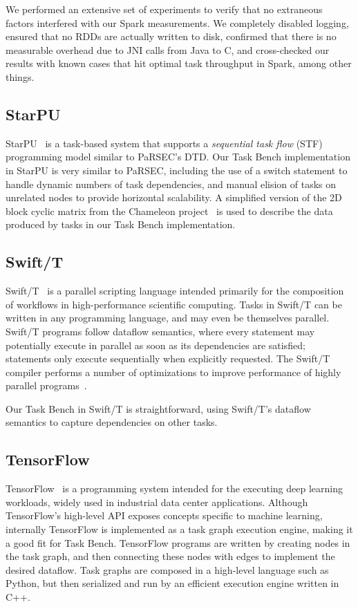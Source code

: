 We performed an extensive set of experiments to verify that no
extraneous factors interfered with our Spark measurements. We
completely disabled logging, ensured that no RDDs are actually written
to disk, confirmed that there is no measurable overhead due to JNI
calls from Java to C, and cross-checked our results with known cases
that hit optimal task throughput in Spark, among other things.

\subsection{StarPU}

StarPU~\cite{StarPU11} is a task-based system that supports a \emph{sequential task flow} (STF)
programming model similar to PaRSEC's DTD. Our Task Bench implementation in
StarPU is very similar to PaRSEC, including the use of a switch
statement to handle dynamic numbers of task dependencies, and manual
elision of tasks on unrelated nodes to provide horizontal scalability.
A simplified version of the 2D block cyclic matrix from the Chameleon 
project~\cite{Chameleon} is used to describe the data produced by tasks in 
our Task Bench implementation.

\subsection{Swift/T}

Swift/T~\cite{Wozniak13} is a parallel scripting language intended
primarily for the composition of workflows in high-performance
scientific computing. Tasks in Swift/T can be written in any
programming language, and may even be themselves parallel. Swift/T
programs follow dataflow semantics, where every statement may
potentially execute in parallel as soon as its dependencies are
satisfied; statements only execute sequentially when explicitly
requested. The Swift/T compiler performs a number of optimizations to
improve performance of highly parallel programs~\cite{Armstrong14}.

Our Task Bench in Swift/T is straightforward, using Swift/T's dataflow
semantics to capture dependencies on other tasks.

\subsection{TensorFlow}

TensorFlow~\cite{TensorFlow15} is a programming system intended for
the executing deep learning workloads, widely used in industrial data
center applications. Although TensorFlow's high-level API exposes
concepts specific to machine learning, internally TensorFlow is
implemented as a task graph execution engine, making it a good fit for
Task Bench. TensorFlow programs are written by creating nodes in the
task graph, and then connecting these nodes with edges to implement
the desired dataflow. Task graphs are composed in a high-level
language such as Python, but then serialized and run by an efficient
execution engine written in C++.

